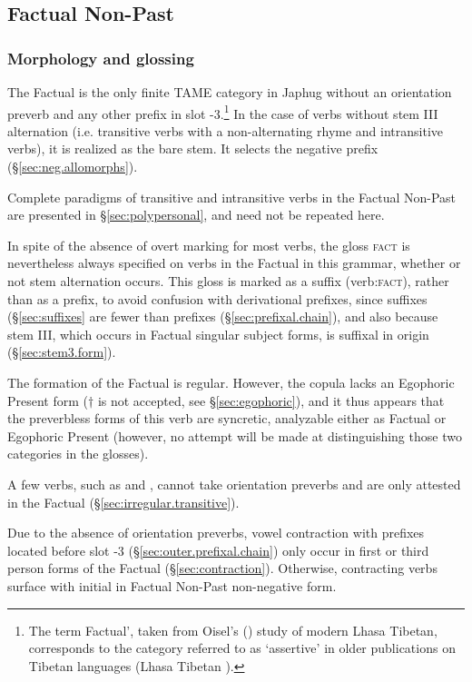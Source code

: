 \subsection{Factual Non-Past} \label{sec:factual}
\subsubsection{Morphology and glossing} \label{sec:fact.morphology}
The Factual is the only finite TAME category in Japhug without an orientation preverb and any other prefix in slot -3.\footnote{The term Factual', taken from Oisel's (\citeyear{oisel13aux}) study of modern Lhasa Tibetan, corresponds to the category referred to as `assertive' in older publications on Tibetan languages (Lhasa Tibetan ).} In the case of verbs without stem III alternation (i.e. transitive verbs with a non-alternating rhyme and intransitive verbs), it is realized as the bare stem. It selects the negative prefix  (§\ref{sec:neg.allomorphs}). 

Complete paradigms of transitive and intransitive verbs in the Factual Non-Past are presented in §\ref{sec:polypersonal}, and need not be repeated here.

In spite of the absence of overt marking for most verbs, the gloss \textsc{fact} is nevertheless always specified on verbs in the Factual in this grammar, whether or not stem alternation occurs. This gloss is marked as a suffix (verb:\textsc{fact}), rather than as a prefix, to avoid confusion with derivational prefixes, since suffixes (§\ref{sec:suffixes} are fewer than prefixes (§\ref{sec:prefixal.chain}), and also because stem III, which occurs in Factual singular subject forms, is suffixal in origin (§\ref{sec:stem3.form}).

The formation of the Factual is regular. However, the copula  lacks an Egophoric Present form ($\dagger$ is not accepted, see §\ref{sec:egophoric}), and it thus appears that the preverbless forms of this verb are syncretic, analyzable either as Factual or Egophoric Present (however, no attempt will be made at distinguishing those two categories in the glosses).

A few verbs, such as  and , cannot take orientation preverbs and are only attested in the Factual (§\ref{sec:irregular.transitive}).


Due to the absence of orientation preverbs, vowel contraction with prefixes located before slot -3 (§\ref{sec:outer.prefixal.chain}) only occur in first or third person forms of the Factual (§\ref{sec:contraction}). Otherwise, contracting verbs surface with initial  in Factual Non-Past non-negative form.
 
